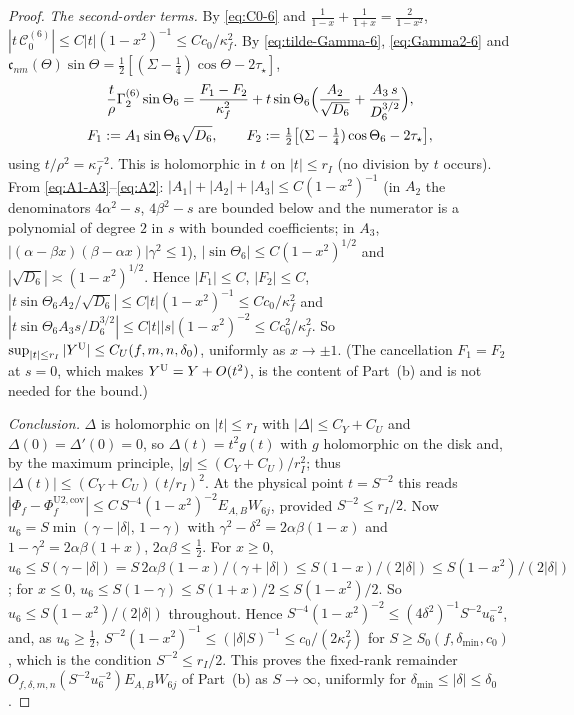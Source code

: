 \documentclass[11pt]{article}
\theoremstyle{definition}
\theoremstyle{remark}
\newcommand{\cC}{\mathcal{C}}
\renewcommand{\_}{\oldunderscore\penalty0\hskip0pt\relax}
\begin{document}
\begin{proof}
\emph{The second-order terms.}  By \eqref{eq:C0-6} and $\frac1{1-x}+\frac1{1+x}=\frac2{1-x^2}$, $|t\,\cC_0^{(6)}|\le C|t|(1-x^2)^{-1}\le Cc_0/\kappa_f^2$.  By \eqref{eq:tilde-Gamma-6}, \eqref{eq:Gamma2-6} and $\mathfrak c_{nm}(\Theta)\sin\Theta=\frac12[(\Sigma-\frac14)\cos\Theta-2\tau_\star]$,
\begin{equation}
 \begin{gathered}
 \frac t\rho\Gamma_2^{(6)}\sin\Theta_6=\frac{F_1-F_2}{\kappa_f^2}+t\sin\Theta_6\Bigl(\frac{A_2}{\sqrt{D_6}}+\frac{A_3\,s}{D_6^{3/2}}\Bigr),\\
 F_1:=A_1\sin\Theta_6\sqrt{D_6},\qquad F_2:=\tfrac12\bigl[(\Sigma-\tfrac14)\cos\Theta_6-2\tau_\star\bigr],
 \end{gathered}
\end{equation}
using $t/\rho^2=\kappa_f^{-2}$.  This is holomorphic in $t$ on $|t|\le r_I$ (no division by $t$ occurs).  From \eqref{eq:A1-A3}--\eqref{eq:A2}: $|A_1|+|A_2|+|A_3|\le C(1-x^2)^{-1}$ (in $A_2$ the denominators $4\alpha^2-s$, $4\beta^2-s$ are bounded below and the numerator is a polynomial of degree $2$ in $s$ with bounded coefficients; in $A_3$, $|(\alpha-\beta x)(\beta-\alpha x)|\gamma^2\le1$), $|\sin\Theta_6|\le C(1-x^2)^{1/2}$ and $|\sqrt{D_6}|\asymp(1-x^2)^{1/2}$.  Hence $|F_1|\le C$, $|F_2|\le C$, $|t\sin\Theta_6A_2/\sqrt{D_6}|\le C|t|(1-x^2)^{-1}\le Cc_0/\kappa_f^2$ and $|t\sin\Theta_6A_3s/D_6^{3/2}|\le C|t||s|(1-x^2)^{-2}\le Cc_0^2/\kappa_f^2$.  So $\sup_{|t|\le r_I}|Y^{\rm U}|\le C_U(f,m,n,\delta_0)$, uniformly as $x\to\pm1$.  (The cancellation $F_1=F_2$ at $s=0$, which makes $Y^{\rm U}=Y+O(t^2)$, is the content of Part~(b) and is not needed for the bound.)

\emph{Conclusion.}  $\Delta$ is holomorphic on $|t|\le r_I$ with $|\Delta|\le C_Y+C_U$ and $\Delta(0)=\Delta'(0)=0$, so $\Delta(t)=t^2g(t)$ with $g$ holomorphic on the disk and, by the maximum principle, $|g|\le(C_Y+C_U)/r_I^2$; thus $|\Delta(t)|\le(C_Y+C_U)(t/r_I)^2$.  At the physical point $t=S^{-2}$ this reads $|\Phi_f-\Phi_f^{\mathrm{U2,cov}}|\le C\,S^{-4}(1-x^2)^{-2}E_{A,B}W_{6j}$, provided $S^{-2}\le r_I/2$.  Now $u_6=S\min(\gamma-|\delta|,\,1-\gamma)$ with $\gamma^2-\delta^2=2\alpha\beta(1-x)$ and $1-\gamma^2=2\alpha\beta(1+x)$, $2\alpha\beta\le\frac12$.  For $x\ge0$, $u_6\le S(\gamma-|\delta|)=S\,2\alpha\beta(1-x)/(\gamma+|\delta|)\le S(1-x)/(2|\delta|)\le S(1-x^2)/(2|\delta|)$; for $x\le0$, $u_6\le S(1-\gamma)\le S(1+x)/2\le S(1-x^2)/2$.  So $u_6\le S(1-x^2)/(2|\delta|)$ throughout. Hence $S^{-4}(1-x^2)^{-2}\le(4\delta^2)^{-1}S^{-2}u_6^{-2}$, and, as $u_6\ge\frac12$, $S^{-2}(1-x^2)^{-1}\le(|\delta|S)^{-1}\le c_0/(2\kappa_f^2)$ for $S\ge S_0(f,\delta_{\min},c_0)$, which is the condition $S^{-2}\le r_I/2$.  This proves the fixed-rank remainder $O_{f,\delta,m,n}(S^{-2}u_6^{-2})E_{A,B}W_{6j}$ of Part~(b) as $S\to\infty$, uniformly for $\delta_{\min}\le|\delta|\le\delta_0$.


\end{proof}
\end{document}

